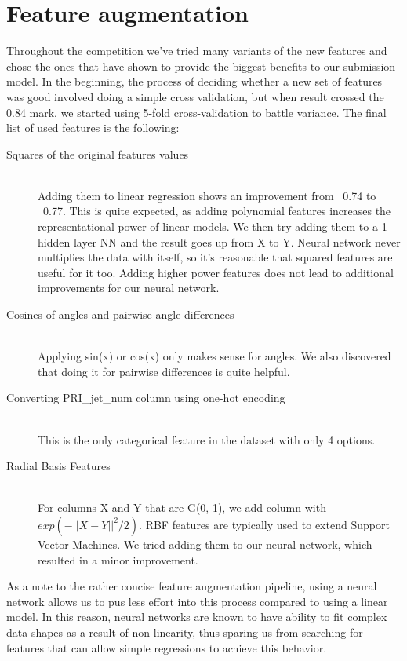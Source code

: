 \documentclass[10pt,conference,compsocconf]{IEEEtran}
\begin{document}
\section{Feature augmentation}
Throughout the competition we've tried many variants of the new features and chose the ones that have shown to provide the biggest benefits to our submission model. In the beginning, the process of deciding whether a new set of features was good involved doing a simple cross validation, but when result crossed the 0.84 mark, we started using 5-fold cross-validation to battle variance. The final list of used features is the following:
\begin{description}
\item[Squares of the original features values] \ \\
	Adding them to linear regression shows an improvement from ~0.74 to ~0.77. This is quite expected, as adding polynomial features increases the representational power of linear models. We then try adding them to a 1 hidden layer NN and the result goes up from X to Y. Neural network never multiplies the data with itself, so it's reasonable that squared features are useful for it too. Adding higher power features does not lead to additional improvements for our neural network.
	
\item[Cosines of angles and pairwise angle differences] \ \\
	Applying sin(x) or cos(x) only makes sense for angles. We also discovered that doing it for pairwise differences is quite helpful.
	
\item[Converting PRI\_jet\_num column using one-hot encoding] \ \\
	This is the only categorical feature in the dataset with only 4 options.
	
\item[Radial Basis Features] \ \\
	For columns X and Y that are G(0, 1), we add column with $exp(-||X-Y||^2/2)$. 
	RBF features are typically used to extend Support Vector Machines. We tried adding them to our neural network, which resulted in a minor improvement.
\end{description}

As a note to the rather concise feature augmentation pipeline, using a neural network allows us to pus less effort into this process compared to using a linear model. In this reason, neural networks are known to have ability to fit complex data shapes as a result of non-linearity, thus sparing us from searching for features that can allow simple regressions to achieve this behavior.
\end{document}
